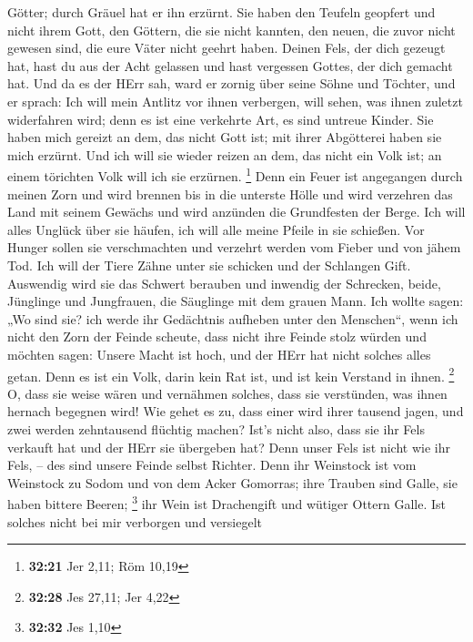 Götter; durch Gräuel hat er ihn erzürnt.  Sie haben den
Teufeln geopfert und nicht ihrem Gott, den Göttern, die sie nicht
kannten, den neuen, die zuvor nicht gewesen sind, die eure Väter nicht
geehrt haben.  Deinen Fels, der dich gezeugt hat, hast du
aus der Acht gelassen und hast vergessen Gottes, der dich gemacht hat.
 Und da es der HErr sah, ward er zornig über seine Söhne
und Töchter,  und er sprach: Ich will mein Antlitz vor
ihnen verbergen, will sehen, was ihnen zuletzt widerfahren wird; denn es
ist eine verkehrte Art, es sind untreue Kinder.  Sie haben
mich gereizt an dem, das nicht Gott ist; mit ihrer Abgötterei haben sie
mich erzürnt. Und ich will sie wieder reizen an dem, das nicht ein Volk
ist; an einem törichten Volk will ich sie erzürnen. \footnote{\textbf{32:21}
  Jer 2,11; Röm 10,19}  Denn ein Feuer ist angegangen durch
meinen Zorn und wird brennen bis in die unterste Hölle und wird
verzehren das Land mit seinem Gewächs und wird anzünden die Grundfesten
der Berge.  Ich will alles Unglück über sie häufen, ich
will alle meine Pfeile in sie schießen.  Vor Hunger sollen
sie verschmachten und verzehrt werden vom Fieber und von jähem Tod. Ich
will der Tiere Zähne unter sie schicken und der Schlangen Gift.
 Auswendig wird sie das Schwert berauben und inwendig der
Schrecken, beide, Jünglinge und Jungfrauen, die Säuglinge mit dem grauen
Mann.  Ich wollte sagen: „Wo sind sie? ich werde ihr
Gedächtnis aufheben unter den Menschen``,  wenn ich nicht
den Zorn der Feinde scheute, dass nicht ihre Feinde stolz würden und
möchten sagen: Unsere Macht ist hoch, und der HErr hat nicht solches
alles getan.  Denn es ist ein Volk, darin kein Rat ist, und
ist kein Verstand in ihnen. \footnote{\textbf{32:28} Jes 27,11; Jer 4,22}
 O, dass sie weise wären und vernähmen solches, dass sie
verstünden, was ihnen hernach begegnen wird!  Wie gehet es
zu, dass einer wird ihrer tausend jagen, und zwei werden zehntausend
flüchtig machen? Ist's nicht also, dass sie ihr Fels verkauft hat und
der HErr sie übergeben hat?  Denn unser Fels ist nicht wie
ihr Fels, -- des sind unsere Feinde selbst Richter.  Denn
ihr Weinstock ist vom Weinstock zu Sodom und von dem Acker Gomorras;
ihre Trauben sind Galle, sie haben bittere Beeren; \footnote{\textbf{32:32}
  Jes 1,10}  ihr Wein ist Drachengift und wütiger Ottern
Galle.  Ist solches nicht bei mir verborgen und versiegelt
